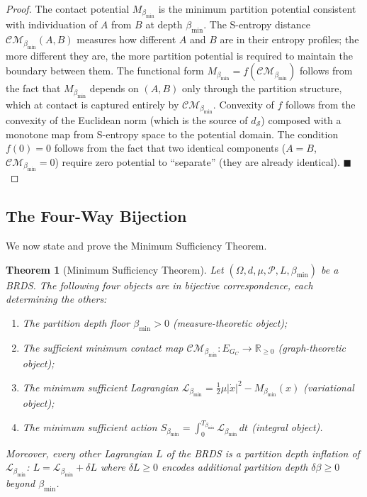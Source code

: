 \documentclass[11pt,twocolumn,a4paper]{article}
\theoremstyle{plain}
\newtheorem{theorem}{Theorem}[section]
\theoremstyle{definition}
\theoremstyle{remark}
\newcommand{\bmin}{\beta_{\min}}
\newcommand{\Lmin}{\mathcal{L}_{\bmin}}
\newcommand{\Smin}{S_{\bmin}}
\newcommand{\CM}{\mathcal{CM}}
\newcommand{\dS}{d_{\mathcal{S}}}
\newcommand{\reals}{\mathbb{R}}
\newcommand{\Pcal}{\mathcal{P}}
\newcommand{\half}{\tfrac{1}{2}}
\renewcommand{\qed}{\hfill$\blacksquare$}
\begin{document}
\begin{proof}
The contact potential $M_{\bmin}$ is the minimum partition potential consistent
with individuation of $A$ from $B$ at depth $\bmin$. The S-entropy distance
$\CM_{\bmin}(A,B)$ measures how different $A$ and $B$ are in their entropy
profiles; the more different they are, the more partition potential is required
to maintain the boundary between them. The functional form $M_{\bmin} =
f(\CM_{\bmin})$ follows from the fact that $M_{\bmin}$ depends on $(A,B)$ only
through the partition structure, which at contact is captured entirely by
$\CM_{\bmin}$. Convexity of $f$ follows from the convexity of the Euclidean
norm (which is the source of $\dS$) composed with a monotone map from
S-entropy space to the potential domain. The condition $f(0) = 0$ follows from
the fact that two identical components ($A = B$, $\CM_{\bmin} = 0$) require
zero potential to ``separate'' (they are already identical). \qed
\end{proof}

\subsection{The Four-Way Bijection}

We now state and prove the Minimum Sufficiency Theorem.

\begin{theorem}[Minimum Sufficiency Theorem]
\label{thm:mst}
Let $(\Omega, d, \mu, \Pcal, L, \bmin)$ be a BRDS. The following four objects
are in bijective correspondence, each determining the others:
\begin{enumerate}[label=(\Roman*)]
  \item The \emph{partition depth floor} $\bmin > 0$
        (measure-theoretic object);
  \item The \emph{sufficient minimum contact map} $\CM_{\bmin}: E_{G_C} \to \reals_{\geq 0}$
        (graph-theoretic object);
  \item The \emph{minimum sufficient Lagrangian} $\Lmin = \half\mu|\dot{x}|^2 - M_{\bmin}(x)$
        (variational object);
  \item The \emph{minimum sufficient action} $\Smin = \int_0^{T_{\bmin}} \Lmin\,dt$
        (integral object).
\end{enumerate}
Moreover, every other Lagrangian $L$ of the BRDS is a \emph{partition depth
inflation} of $\Lmin$: $L = \Lmin + \delta L$ where $\delta L \geq 0$
encodes additional partition depth $\delta\beta \geq 0$ beyond $\bmin$.
\end{theorem}
\end{document}
